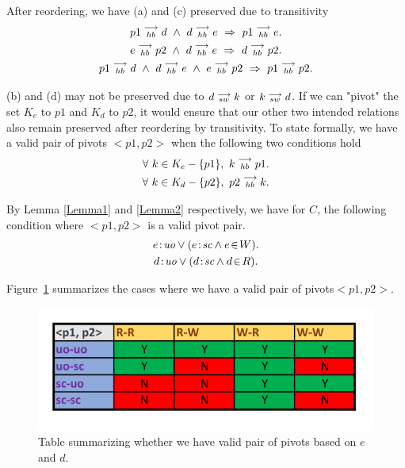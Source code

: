     After reordering, we have (a) and (c) preserved due to transitivity  
    \begin{gather*}
        \reln{p1}{hb}{d} \ \wedge \ \reln{d}{hb}{e} \ \Rightarrow \ \reln{p1}{hb}{e}. \\
        \reln{e}{hb}{p2} \ \wedge \ \reln{d}{hb}{e} \ \Rightarrow \ \reln{d}{hb}{p2}. \\
        \reln{p1}{hb}{d} \ \wedge \ \reln{d}{hb}{e} \ \wedge \ \reln{e}{hb}{p2} \ \Rightarrow \ \reln{p1}{hb}{p2}. 
    \end{gather*}

    (b) and (d) may not be preserved due to $d\stackrel{\longrightarrow}{_{sw}}k$ or $k\stackrel{\longrightarrow}{_{sw}}d$. If we can "pivot" the  set $K_e$ to $p1$ and $K_d$ to $p2$, it would ensure that our other two intended relations also remain preserved after reordering by transitivity. To state formally, we have a valid pair of pivots $<p1,p2>$ when the following two conditions hold
    \begin{gather*}
        \forall \ k \in K_e - \{p1\}, \ k\stackrel{\longrightarrow}{_{hb}}p1. \\
        \forall \ k \in K_d - \{p2\}, \ p2\stackrel{\longrightarrow}{_{hb}}k.
    \end{gather*}
    
    By Lemma \ref{Lemma1} and \ref{Lemma2} respectively, we have for $C$, the following condition where $<p1, p2>$ is a valid pivot pair.
    \begin{gather*}
        \et{e}{uo} \vee (\et{e}{sc} \wedge \event{e}{W}). \\
        \et{d}{uo} \vee (\et{d}{sc} \wedge \event{d}{R}).
    \end{gather*}
        
    Figure~\ref{reord:preserve_hb_table} summarizes the cases where we have a valid pair of pivots\footnotemark $<p1,p2>$.
    \begin{figure}[H]
        \centering
        \includegraphics[scale=0.7]{5.InstructionReordering/4.ValidReorderingCandidate/ProofParts/Part1/part1_table.pdf}
        \caption{Table summarizing whether we have valid pair of pivots based on  $e$ and $d$.}
        \label{reord:preserve_hb_table}
    \end{figure}
            

